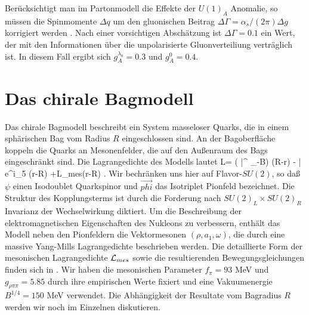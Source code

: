 Ber\"ucksichtigt man im Partonmodell die Effekte der $U(1)_A$
Anomalie, so m\"ussen die Spinmomente $\Delta q$ um den 
gluonischen Beitrag $\Delta \Gamma =\alpha_s/(2\pi)\Delta g$ 
korrigiert werden \cite{AR88}. Nach einer vorsichtigen Absch\"atzung    
\cite{AS89} ist $\Delta \Gamma = 0.1$ ein Wert, der mit den 
Informationen \"uber die unpolarisierte Gluonverteiliung 
vertr\"aglich ist. In diesem Fall ergibt sich $g_A^{\lambda_0}
=0.3$ und $g_A^0=0.4$.   

\section{Das chirale Bagmodell}
Das chirale Bagmodell beschreibt ein System masseloser Quarks,
die in einem sph\"arischen Bag vom Radius $R$ eingeschlossen
sind. An der Bagoberfl\"ache koppeln die Quarks an Mesonenfelder,
die auf den Au\ss enraum des Bags eingeschr\"ankt sind. Die 
Lagrangedichte des Modells lautet 
\be
\label{LCB}
{\cal L}= \left( \bar{\psi}\gamma^{\mu}\stackrel{\leftrightarrow}
{\partial}_{\mu}\psi -B\right) \Theta (R-r) -  \bar{\psi}
e^{i\gamma_5 \vec{\tau}\cdot\vec{\phi}}\psi\delta (r-R)
+{\cal L}_{mes}\Theta (r-R) \; .
\ee
Wir bechr\"anken uns hier auf Flavor-$SU(2)$, so da\ss\ $\psi$ einen 
Isodoublet Quarkspinor und $\vec{phi}$ das Isotriplet Pionfeld 
bezeichnet. Die Struktur des Kopplungsterms ist durch die Forderung 
nach $SU(2)_L\times SU(2)_R$ Invarianz der Wechselwirkung diktiert.
Um die Beschreibung der elektromagnetischen Eigenschaften des 
Nukleons zu verbessern, enth\"alt das Modell neben den Pionfeldern
die Vektormesonen $(\rho,a_1,\omega)$, die durch eine massive 
Yang-Mills Lagrangedichte beschrieben werden. Die detaillierte 
Form der mesonischen Lagrangedichte ${\cal L}_{mes}$ sowie die
resultierenden Bewegungsgleichungen finden sich in \cite{HTW90}.
Wir haben die mesonischen Parameter $f_\pi=93$ MeV und $g_{\rho\pi\pi}
=5.85$ durch ihre empirischen Werte fixiert und eine Vakuumenergie
$B^{1/4}=150$ MeV verwendet. Die Abh\"angigkeit der Resultate vom
Bagradius $R$ werden wir noch im Einzelnen diskutieren.


